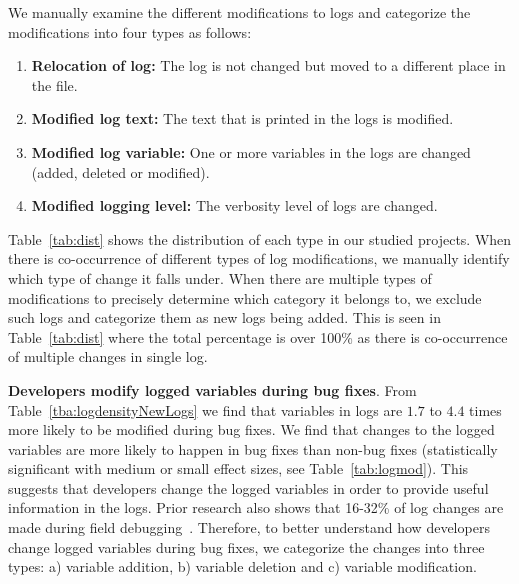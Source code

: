We manually examine the different modifications to logs and categorize the modifications into four types as follows:
\begin{enumerate}
	\item \textbf{Relocation of log:} The log is not changed but moved to a different place in the file.
	\item \textbf{Modified log text:} The text that is printed in the logs is modified.
	\item \textbf{Modified log variable:} One or more variables in the logs are changed (added, deleted or modified).
	\item \textbf{Modified logging level:} The verbosity level of logs are changed.
\end{enumerate}
Table~\ref{tab:dist} shows the distribution of each type in our studied projects. When there is co-occurrence of different types of log modifications, we manually identify which type of change it falls under. When there are multiple types of modifications to precisely determine which category it belongs to, we exclude such logs and categorize them as new logs being added. This is seen in Table~\ref{tab:dist} where the total percentage is over 100\% as there is co-occurrence of multiple changes in single log. 


\textbf{Developers modify logged variables during bug fixes}. From Table~\ref{tba:logdensityNewLogs} we find that variables in logs are $1.7$ to $4.4$ times more likely to be modified during bug fixes. We find that changes to the logged variables are more likely to happen in bug fixes than non-bug fixes (statistically significant with medium or small effect sizes, see Table~\ref{tab:logmod}). This suggests that developers change the logged variables in order to provide useful information in the logs. Prior research also shows that 16-32\% of log changes are made during field debugging~\cite{EMSEIAN}. Therefore, to better understand how developers change logged variables during bug fixes, we categorize the changes into three types: a) variable addition, b) variable deletion and c) variable modification.

